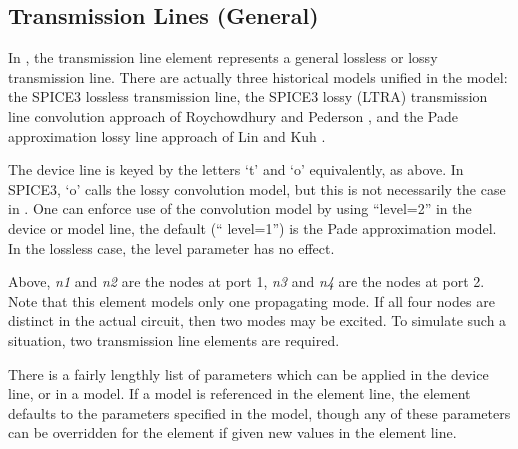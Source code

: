 \subsection{Transmission Lines (General)}
\label{tline}



In {\WRspice}, the transmission line element represents a general
lossless or lossy transmission line.  There are actually three
historical models unified in the {\WRspice} model:  the SPICE3
lossless transmission line, the SPICE3 lossy (LTRA) transmission line
convolution approach of Roychowdhury and Pederson \cite{ltra}, and the
Pade approximation lossy line approach of Lin and Kuh \cite{lin}.

The device line is keyed by the letters `{\vt t}' and `{\vt o}'
equivalently, as above.  In SPICE3, `{\vt o}' calls the lossy
convolution model, but this is not necessarily the case in
{\WRspice}.  One can enforce use of the convolution model by using
``{\vt level=2}'' in the device or model line, the default (``{\vt
level=1}'') is the Pade approximation model.  In the lossless case,
the {\vt level} parameter has no effect.

Above, {\it n1\/} and {\it n2\/} are the nodes at port 1, {\it n3\/}
and {\it n4\/} are the nodes at port 2.  Note that this element
models only one propagating mode.  If all four nodes are distinct in
the actual circuit, then two modes may be excited.  To simulate such
a situation, two transmission line elements are required.

There is a fairly lengthly list of parameters which can be applied
in the device line, or in a model.  If a model is referenced in the
element line, the element defaults to the parameters specified in
the model, though any of these parameters can be overridden for the
element if given new values in the element line.

